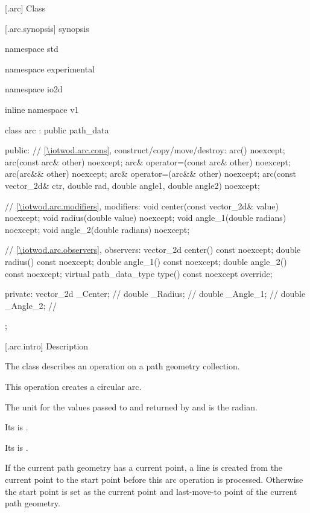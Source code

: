  [\iotwod.arc] {Class }

 [\iotwod.arc.synopsis] { synopsis}

\begin{codeblock}
namespace std { namespace experimental { namespace io2d { inline namespace v1 {
  class arc : public path_data {
  public:
    // \ref{\iotwod.arc.cons}, construct/copy/move/destroy:
    arc() noexcept;
    arc(const arc& other) noexcept;
    arc& operator=(const arc& other) noexcept;
    arc(arc&& other) noexcept;
    arc& operator=(arc&& other) noexcept;
    arc(const vector_2d& ctr, double rad, double angle1, double angle2) noexcept;

    // \ref{\iotwod.arc.modifiers}, modifiers:
    void center(const vector_2d& value) noexcept;
    void radius(double value) noexcept;
    void angle_1(double radians) noexcept;
    void angle_2(double radians) noexcept;

    // \ref{\iotwod.arc.observers}, observers:
    vector_2d center() const noexcept;
    double radius() const noexcept;
    double angle_1() const noexcept;
    double angle_2() const noexcept;
    virtual path_data_type type() const noexcept override;

  private:
    vector_2d _Center; // \expos
    double _Radius;    // \expos
    double _Angle_1;   // \expos
    double _Angle_2;   // \expos
  };
} } } }
\end{codeblock}

 [\iotwod.arc.intro] { Description}

\pnum
{}
The class  describes an operation on a path geometry collection.

\pnum
This operation creates a circular arc.

\pnum
The unit for the values passed to and returned by  and  is the radian.

\pnum
Its  is .

\pnum
Its  is .

\pnum
If the current path geometry has a current point, a line is created from the current point to the start point before this arc operation is processed. Otherwise the start point is set as the current point and last-move-to point of the current path geometry.


